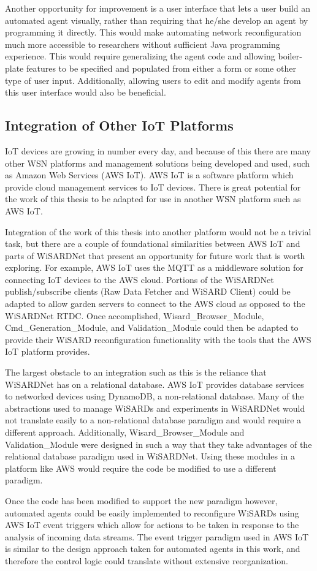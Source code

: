 Another opportunity for improvement is a user interface that lets a user build an automated agent visually, rather than requiring that he/she develop an agent by programming it directly. This would make automating network reconfiguration much more accessible to researchers without sufficient Java programming experience. This would require generalizing the agent code and allowing boiler-plate features to be specified and populated from either a form or some other type of user input. Additionally, allowing users to edit and modify agents from this user interface would also be beneficial.

\subsection{Integration of Other IoT Platforms}
IoT devices are growing in number every day, and because of this there are many other WSN platforms and management solutions being developed and used, such as Amazon Web Services (AWS IoT). AWS IoT is a software platform which provide cloud management services to IoT devices. There is great potential for the work of this thesis to be adapted for use in another WSN platform such as AWS IoT.

Integration of the work of this thesis into another platform would not be a trivial task, but there are a couple of foundational similarities between AWS IoT and parts of WiSARDNet that present an opportunity for future work that is worth exploring. For example, AWS IoT uses the  MQTT as a middleware solution for connecting IoT devices to the AWS cloud. Portions of the WiSARDNet publish/subscribe clients (Raw Data Fetcher and WiSARD Client) could be adapted to allow garden servers to connect to the AWS cloud as opposed to the WiSARDNet RTDC. Once accomplished, Wisard\_Browser\_Module, Cmd\_Generation\_Module, and Validation\_Module could then be adapted to provide their WiSARD reconfiguration functionality with the tools that the AWS IoT platform provides.

The largest obstacle to an integration such as this is the reliance that WiSARDNet has on a relational database. AWS IoT provides database services to networked devices using DynamoDB, a non-relational database. Many of the abstractions used to manage WiSARDs and experiments in WiSARDNet would not translate easily to a non-relational database paradigm and would require a different approach. Additionally, Wisard\_Browser\_Module and Validation\_Module were designed in such a way that they take advantages of the relational database paradigm used in WiSARDNet. Using these modules in a platform like AWS would require the code be modified to use a different paradigm.

Once the code has been modified to support the new paradigm however, automated agents could be easily implemented to reconfigure WiSARDs using AWS IoT event triggers which allow for actions to be taken in response to the analysis of incoming data streams. The event trigger paradigm used in AWS IoT is similar to the design approach taken for automated agents in this work, and therefore the control logic could translate without extensive reorganization.


